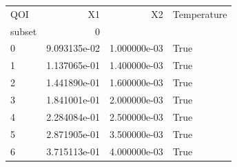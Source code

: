 \begin{tabular}{lrrl}
\toprule
QOI &           X1 &           X2 & Temperature \\
subset &           0 \\
\midrule
0 & 9.093135e-02 & 1.000000e-03 &        True \\
1 & 1.137065e-01 & 1.400000e-03 &        True \\
2 & 1.441890e-01 & 1.600000e-03 &        True \\
3 & 1.841001e-01 & 2.000000e-03 &        True \\
4 & 2.284084e-01 & 2.500000e-03 &        True \\
5 & 2.871905e-01 & 3.500000e-03 &        True \\
6 & 3.715113e-01 & 4.000000e-03 &        True \\
\bottomrule
\end{tabular}
